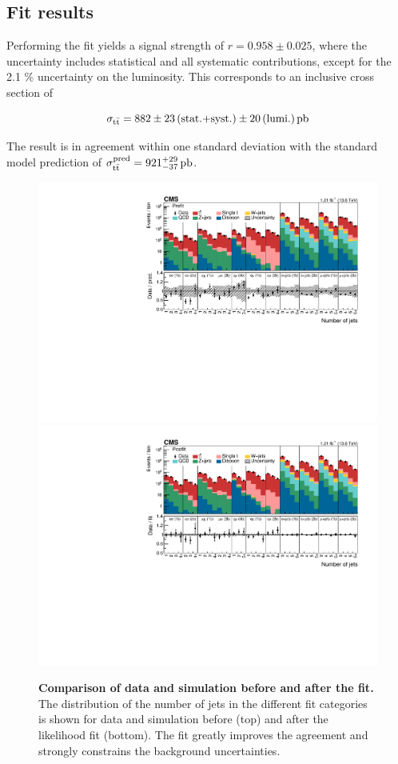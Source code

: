 \subsection{Fit results}
\label{sec:ttxs:fitresults}

Performing the fit yields a \ttbar signal strength of $r = 0.958 \pm 0.025$, where the uncertainty includes statistical and all systematic contributions, except for the 2.1 \% uncertainty on the luminosity. This corresponds to an inclusive \ttbar cross section of

\[
    \sigma_{\mathrm{t \bar{t}}} = 882 \pm 23 \, \text{(stat.+syst.)} \pm 20 \, \text{(lumi.)} \, \text{pb}
\]

The result is in agreement within one standard deviation with the standard model prediction of $\sigma_{\mathrm{t \bar{t}}}^{\text{pred}} = 921^{+29}_{-37} \, \text{pb}$.

\begin{figure}[!p]
\centering
\includegraphics[width=\textwidth]{figures/ttxs/prefithist.pdf}
\includegraphics[width=\textwidth]{figures/ttxs/postfithist.pdf}

\caption{
   \textbf{Comparison of data and simulation before and after the fit.} The distribution of the number of jets in the different fit categories is shown for data and simulation before (top) and after the likelihood fit (bottom). The fit greatly improves the agreement and strongly constrains the background uncertainties.
}
\label{fig:ttxs:prepostfit}
\end{figure}

